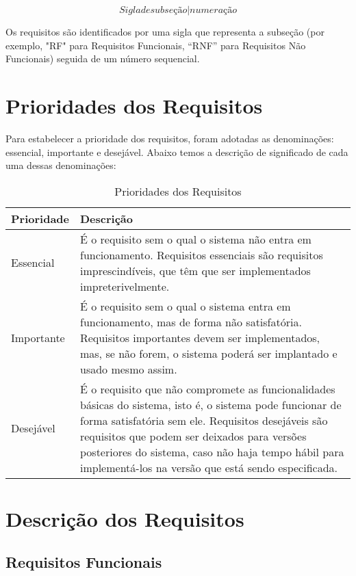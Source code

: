 \textbf{\[ Sigla de subseção | numeração\]}

Os requisitos são identificados por uma sigla que representa a subseção (por exemplo, "RF" para Requisitos Funcionais, “RNF” para Requisitos Não Funcionais) seguida de um número sequencial.

\section{Prioridades dos Requisitos}
\label{sec:prioridades_requisitos}

Para estabelecer a prioridade dos requisitos, foram adotadas as denominações: essencial, importante e desejável. Abaixo temos a descrição de significado de cada uma dessas denominações:

\begin{table}[H]
\centering
\caption{Prioridades dos Requisitos}
\label{tab:prioridades_requisitos}
\begin{tabular}{|l|p{10cm}|}
\hline
\textbf{Prioridade} & \textbf{Descrição} \\ \hline
Essencial & É o requisito sem o qual o sistema não entra em funcionamento. Requisitos essenciais são requisitos imprescindíveis, que têm que ser implementados impreterivelmente. \\ \hline
Importante & É o requisito sem o qual o sistema entra em funcionamento, mas de forma não satisfatória. Requisitos importantes devem ser implementados, mas, se não forem, o sistema poderá ser implantado e usado mesmo assim. \\ \hline
Desejável & É o requisito que não compromete as funcionalidades básicas do sistema, isto é, o sistema pode funcionar de forma satisfatória sem ele. Requisitos desejáveis são requisitos que podem ser deixados para versões posteriores do sistema, caso não haja tempo hábil para implementá-los na versão que está sendo especificada. \\ \hline
\end{tabular}
\end{table}

\section{Descrição dos Requisitos}
\label{sec:descricao_requisitos}

\subsection{Requisitos Funcionais}

